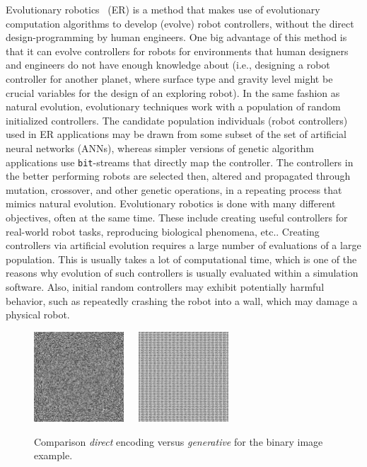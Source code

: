 Evolutionary robotics~\cite{WikievolutionaryRobotics} (ER) is a method that makes use of evolutionary computation algorithms to develop (evolve) robot controllers, without the direct design-programming by human engineers. One big advantage of this method is that it can evolve controllers for robots for environments that human designers and engineers do not have enough knowledge about (i.e., designing a robot controller for another planet, where surface type and gravity level might be crucial variables for the design of an exploring robot). In the same fashion as natural evolution, evolutionary techniques work with a population of random initialized controllers. The candidate population individuals (robot controllers) used in ER applications may be drawn from some subset of the set of artificial neural networks (ANNs), whereas simpler versions of genetic algorithm applications use \texttt{bit}-streams that directly map the controller. The controllers in the better performing robots are selected then, altered and propagated through mutation, crossover, and other genetic operations, in a repeating process that mimics natural evolution. Evolutionary robotics is done with many different objectives, often at the same time. These include creating useful controllers for real-world robot tasks, reproducing biological phenomena, etc.. Creating controllers via artificial evolution requires a large number of evaluations of a large population. This is usually takes a lot of computational time, which is one of the reasons why evolution of such controllers is usually evaluated within a simulation software. Also, initial random controllers may exhibit potentially harmful behavior, such as repeatedly crashing the robot into a wall, which may damage a physical robot.

\begin{figure}
\centering
\includegraphics[width=0.3\textwidth]{../Figures/Misc/direct.jpg}\  \   \   
\includegraphics[width=0.3\textwidth]{../Figures/Misc/indirect.jpg}
\caption{Comparison \emph{direct} encoding versus \emph{generative} for the binary image example.}
\label{fig:directVsIndirectEncoding}
\end{figure}

